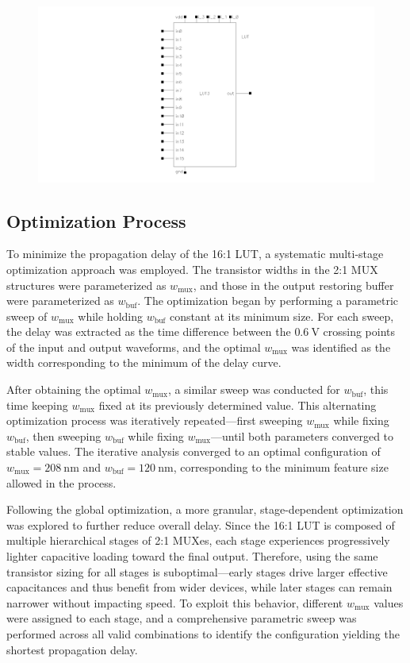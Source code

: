 \documentclass[12pt]{article}
\begin{document}
\begin{figure}[H]
    \centering
    \includegraphics[width=0.8\linewidth]{writeup//figures/updated_delay_opt_LUTsym.png}
    \caption{}
\end{figure}

\newpage

\subsection{Optimization Process}

To minimize the propagation delay of the 16:1 LUT, a systematic multi-stage optimization approach was employed. The transistor widths in the 2:1 MUX structures were parameterized as $w_{\text{mux}}$, and those in the output restoring buffer were parameterized as $w_{\text{buf}}$. The optimization began by performing a parametric sweep of $w_{\text{mux}}$ while holding $w_{\text{buf}}$ constant at its minimum size. For each sweep, the delay was extracted as the time difference between the $0.6~\text{V}$ crossing points of the input and output waveforms, and the optimal $w_{\text{mux}}$ was identified as the width corresponding to the minimum of the delay curve.  

After obtaining the optimal $w_{\text{mux}}$, a similar sweep was conducted for $w_{\text{buf}}$, this time keeping $w_{\text{mux}}$ fixed at its previously determined value. This alternating optimization process was iteratively repeated—first sweeping $w_{\text{mux}}$ while fixing $w_{\text{buf}}$, then sweeping $w_{\text{buf}}$ while fixing $w_{\text{mux}}$—until both parameters converged to stable values. The iterative analysis converged to an optimal configuration of $w_{\text{mux}} = 208~\text{nm}$ and $w_{\text{buf}} = 120~\text{nm}$, corresponding to the minimum feature size allowed in the process.  

Following the global optimization, a more granular, stage-dependent optimization was explored to further reduce overall delay. Since the 16:1 LUT is composed of multiple hierarchical stages of 2:1 MUXes, each stage experiences progressively lighter capacitive loading toward the final output. Therefore, using the same transistor sizing for all stages is suboptimal—early stages drive larger effective capacitances and thus benefit from wider devices, while later stages can remain narrower without impacting speed. To exploit this behavior, different $w_{\text{mux}}$ values were assigned to each stage, and a comprehensive parametric sweep was performed across all valid combinations to identify the configuration yielding the shortest propagation delay.  
\end{document}
